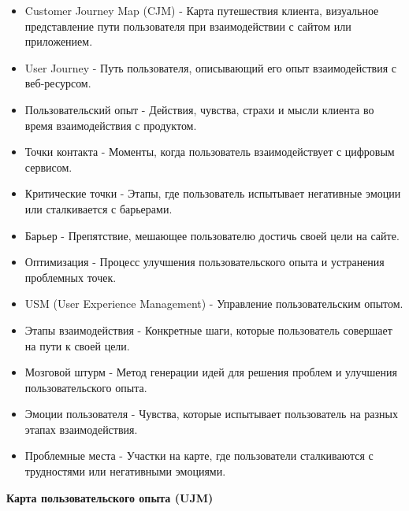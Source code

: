\begin{itemize}
    \item Customer Journey Map (CJM) - Карта путешествия клиента, визуальное представление пути пользователя при взаимодействии с сайтом или приложением.
    \item User Journey - Путь пользователя, описывающий его опыт взаимодействия с веб-ресурсом.
    \item Пользовательский опыт - Действия, чувства, страхи и мысли клиента во время взаимодействия с продуктом.
    \item Точки контакта - Моменты, когда пользователь взаимодействует с цифровым сервисом.
    \item Критические точки - Этапы, где пользователь испытывает негативные эмоции или сталкивается с барьерами.
    \item Барьер - Препятствие, мешающее пользователю достичь своей цели на сайте.
    \item Оптимизация - Процесс улучшения пользовательского опыта и устранения проблемных точек.
    \item USM (User Experience Management) - Управление пользовательским опытом.
    \item Этапы взаимодействия - Конкретные шаги, которые пользователь совершает на пути к своей цели.
    \item Мозговой штурм - Метод генерации идей для решения проблем и улучшения пользовательского опыта.
    \item Эмоции пользователя - Чувства, которые испытывает пользователь на разных этапах взаимодействия.
    \item Проблемные места - Участки на карте, где пользователи сталкиваются с трудностями или негативными эмоциями.
\end{itemize}
\bigskip

\textbf{Карта пользовательского опыта (UJM)}

\noindent
\begin{minipage}{\linewidth}
\end{minipage}
\bigskip

